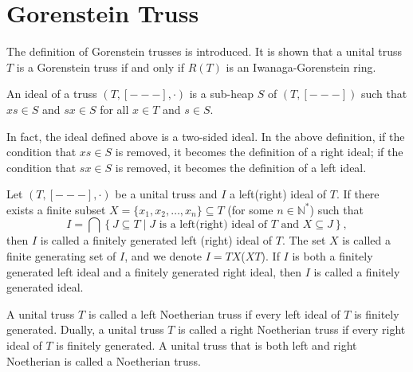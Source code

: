 \documentclass[11pt, twoside]{article}
\begin{document}
\section{Gorenstein Truss}

The definition of Gorenstein trusses is introduced. It is shown that a unital truss $T$ is a Gorenstein truss if and only if $R(T)$ is an Iwanaga-Gorenstein ring.

\begin{definition}{\rm \cite[Definition 3.25]{rtb}}
An ideal of a truss $(T,[- - -],\cdot)$ is a sub-heap $S$ of $(T,[- - -])$ such that $xs\in S$ and $sx\in S$ for all $x\in T$ and $s\in S$.
\end{definition}
In fact, the ideal defined above is a two-sided ideal. In the above definition, if the condition that $xs\in S$ is removed, it becomes the definition of a right ideal; if the condition that $sx\in S$ is removed, it becomes the definition of a left ideal.

\begin{definition}
Let $(T, [---], \cdot)$ be a unital truss and $I$ a left(right) ideal of $T$.
If there exists a finite subset $X = \{x_1, x_2, \dots, x_n\} \subseteq T$ (for some $n \in \mathbb{N}^*$) such that
$$I = \bigcap \left\{ J \subseteq T \mid J \text{ is a left(right) ideal of } T \text{ and } X \subseteq J \right\},$$
then $I$ is called a finitely generated left (right) ideal of $T$.
The set $X$ is called a finite generating set of $I$, and we denote $I = TX$($XT$). If $I$ is both a finitely generated left ideal and a finitely generated right ideal, then $I$ is called a finitely generated ideal.
\end{definition}

\begin{definition}
A unital truss $T$ is called a left Noetherian truss if every left ideal of $T$ is finitely generated. Dually, a unital truss $T$ is called a right Noetherian truss if every right ideal of $T$ is finitely generated. A unital truss that is both left and right Noetherian is called a Noetherian truss.
\end{definition}
\end{document}
